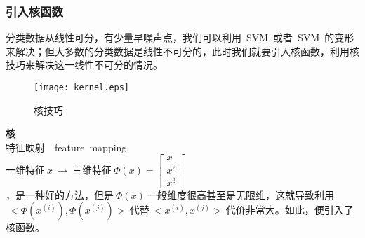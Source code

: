 \subsubsection{引入核函数}
分类数据从线性可分，有少量早噪声点，我们可以利用~SVM~或者~SVM~的变形来解决；但大多数的分类数据是线性不可分的，此时我们就要引入核函数，利用核技巧来解决这一线性不可分的情况。

\begin{figure}[!htb]
  \centering
  \texttt{[image: kernel.eps]}
  \caption{核技巧}
\end{figure}

\textbf{核} \\
\indent 特征映射~~feature~mapping.\\
\indent 一维特征$~x~\rightarrow~$三维特征$~\Phi(x)=\begin{bmatrix} x \\ x^2\\ x^3\end{bmatrix}~$\\
，是一种好的方法，但是$~\Phi(x)~$一般维度很高甚至是无限维，这就导致利用$~<\Phi(x^{(i)}),\Phi(x^{(j)})>~$代替$~<x^{(i)},x^{(j)}>~$代价非常大。如此，便引入了核函数。

